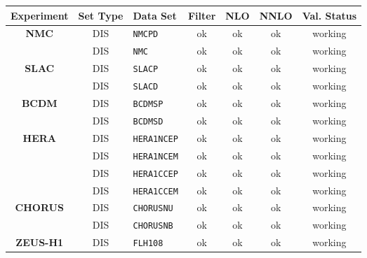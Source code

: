 \begin{table}[H]
\begin{centering}
{\scriptsize }%
\begin{tabular}{|c|c|l|c|c|c|c|}
\hline 
\textbf{\scriptsize Experiment} & \textbf{\scriptsize Set Type} & \textbf{\scriptsize Data Set} & \textbf{\scriptsize Filter} & \textbf{\scriptsize NLO} & \textbf{\scriptsize NNLO} & \textbf{\scriptsize Val. Status}\tabularnewline
\hline 
\hline 
\textbf{\scriptsize NMC} & {\scriptsize DIS} & \texttt{\scriptsize NMCPD} & {\scriptsize ok} & {\scriptsize ok} & {\scriptsize ok} & {\scriptsize working}\tabularnewline
\cline{2-7} 
 & {\scriptsize DIS} & \texttt{\scriptsize NMC} & {\scriptsize ok} & {\scriptsize ok} & {\scriptsize ok} & {\scriptsize working}\tabularnewline
\hline 
\textbf{\scriptsize SLAC} & {\scriptsize DIS} & \texttt{\scriptsize SLACP} & {\scriptsize ok} & {\scriptsize ok} & {\scriptsize ok} & {\scriptsize working}\tabularnewline
\cline{2-7} 
 & {\scriptsize DIS} & \texttt{\scriptsize SLACD} & {\scriptsize ok} & {\scriptsize ok} & {\scriptsize ok} & {\scriptsize working}\tabularnewline
\hline 
\textbf{\scriptsize BCDM} & {\scriptsize DIS} & \texttt{\scriptsize BCDMSP} & {\scriptsize ok} & {\scriptsize ok} & {\scriptsize ok} & {\scriptsize working}\tabularnewline
\cline{2-7} 
 & {\scriptsize DIS} & \texttt{\scriptsize BCDMSD} & {\scriptsize ok} & {\scriptsize ok} & {\scriptsize ok} & {\scriptsize working}\tabularnewline
\hline 
\textbf{\scriptsize HERA} & {\scriptsize DIS} & \texttt{\scriptsize HERA1NCEP} & {\scriptsize ok} & {\scriptsize ok} & {\scriptsize ok} & {\scriptsize working}\tabularnewline
\cline{2-7} 
 & {\scriptsize DIS} & \texttt{\scriptsize HERA1NCEM} & {\scriptsize ok} & {\scriptsize ok} & {\scriptsize ok} & {\scriptsize working}\tabularnewline
\cline{2-7} 
 & {\scriptsize DIS} & \texttt{\scriptsize HERA1CCEP} & {\scriptsize ok} & {\scriptsize ok} & {\scriptsize ok} & {\scriptsize working}\tabularnewline
\cline{2-7} 
 & {\scriptsize DIS} & \texttt{\scriptsize HERA1CCEM} & {\scriptsize ok} & {\scriptsize ok} & {\scriptsize ok} & {\scriptsize working}\tabularnewline
\hline 
\textbf{\scriptsize CHORUS} & {\scriptsize DIS} & \texttt{\scriptsize CHORUSNU} & {\scriptsize ok} & {\scriptsize ok} & {\scriptsize ok} & {\scriptsize working}\tabularnewline
\cline{2-7} 
 & {\scriptsize DIS} & \texttt{\scriptsize CHORUSNB} & {\scriptsize ok} & {\scriptsize ok} & {\scriptsize ok} & {\scriptsize working}\tabularnewline
\hline 
\textbf{\scriptsize ZEUS-H1} & {\scriptsize DIS} & \texttt{\scriptsize FLH108} & {\scriptsize ok} & {\scriptsize ok} & {\scriptsize ok} & {\scriptsize working}\tabularnewline

\end{tabular}
\end{centering}
\end{table}
